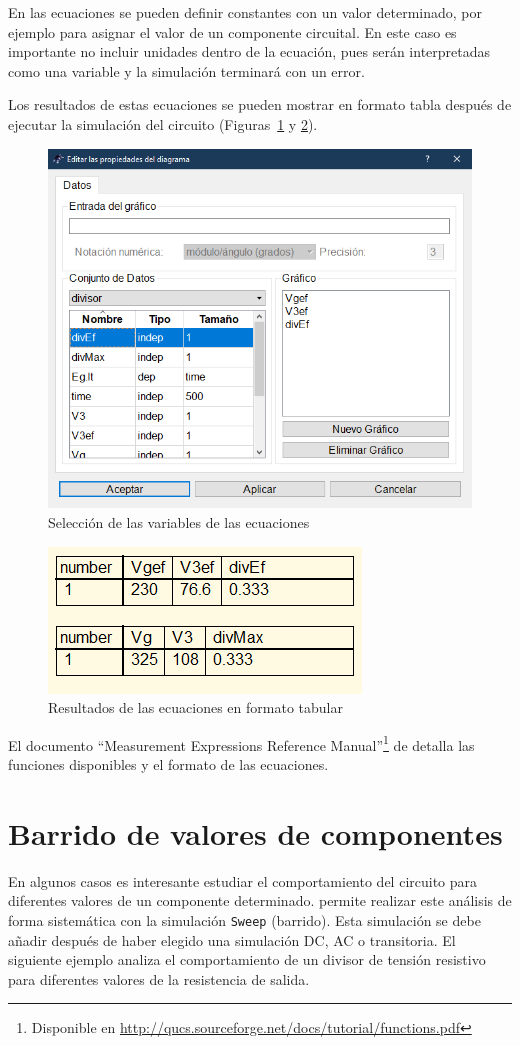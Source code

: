 \documentclass[a4paper,10pt]{article} %
\begin{document}
En las ecuaciones se pueden definir constantes con un valor determinado, por ejemplo para asignar el valor de un componente circuital. En este caso es importante no incluir unidades dentro de la ecuación, pues serán interpretadas como una variable y la simulación terminará con un error.

Los resultados de estas ecuaciones se pueden mostrar en formato tabla después de ejecutar la simulación del circuito (Figuras~\ref{fig.qucs27} y \ref{fig.qucs28}).

\begin{figure}[h!]
    \centering
    \includegraphics[width=0.45\linewidth]{../figs/qucs_seleccionVariablesEcuacion.png}
    \caption{Selección de las variables de las ecuaciones}
    \label{fig.qucs27}
\end{figure}

\begin{figure}[h!]
    \centering
    \includegraphics[width=0.25\linewidth]{../figs/qucs_resultadosEcuacion.png}
    \caption{Resultados de las ecuaciones en formato tabular}
    \label{fig.qucs28}
\end{figure}

El documento ``Measurement Expressions Reference Manual''\footnote{Disponible en \url{http://qucs.sourceforge.net/docs/tutorial/functions.pdf}} de {\qucs} detalla las funciones disponibles y el formato de las ecuaciones. 

\section{Barrido de valores de componentes}

En algunos casos es interesante estudiar el comportamiento del circuito para diferentes valores de un componente determinado. {\qucs} permite realizar este análisis de forma sistemática con la simulación \texttt{Sweep} (barrido). Esta simulación se debe añadir después de haber elegido una simulación DC, AC o transitoria. El siguiente ejemplo analiza el comportamiento de un divisor de tensión resistivo para diferentes valores de la resistencia de salida.
\end{document}
